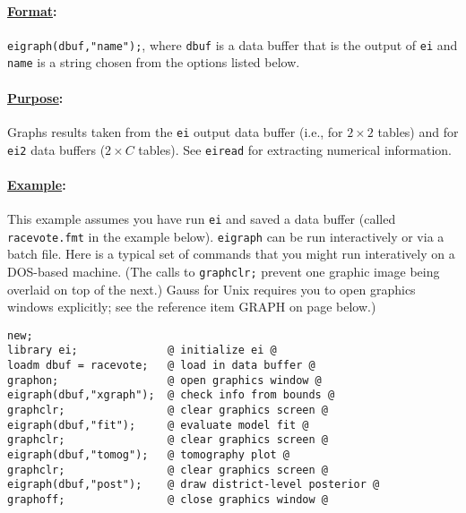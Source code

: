 \documentclass[11pt,titlepage]{article}
\begin{document}
\paragraph{\underline{Format}:} \texttt{eigraph(dbuf,"name");}, where
\texttt{dbuf} is a data buffer that is the output of \texttt{ei} and
\texttt{name} is a string chosen from the options listed below.

\paragraph{\underline{Purpose}:}
Graphs results taken from the \texttt{ei} output data buffer (i.e.,
for $2\times 2$ tables) and for \texttt{ei2} data buffers ($2\times C$
tables).  See \texttt{eiread} for extracting numerical information.

\paragraph{\underline{Example}:}
This example assumes you have run \texttt{ei} and saved a data buffer
(called \texttt{racevote.fmt} in the example below).  \texttt{eigraph}
can be run interactively or via a batch file.  Here is a typical set
of commands that you might run interatively on a DOS-based machine.
(The calls to \texttt{graphclr;} prevent one graphic image being
overlaid on top of the next.)  Gauss for Unix requires you to open
graphics windows explicitly; see the reference item GRAPH on page
\pageref{graph} below.)
\begin{verbatim}
new;
library ei;              @ initialize ei @
loadm dbuf = racevote;   @ load in data buffer @
graphon;                 @ open graphics window @
eigraph(dbuf,"xgraph");  @ check info from bounds @
graphclr;                @ clear graphics screen @
eigraph(dbuf,"fit");     @ evaluate model fit @
graphclr;                @ clear graphics screen @
eigraph(dbuf,"tomog");   @ tomography plot @
graphclr;                @ clear graphics screen @
eigraph(dbuf,"post");    @ draw district-level posterior @
graphoff;                @ close graphics window @
\end{verbatim}
\end{document}
